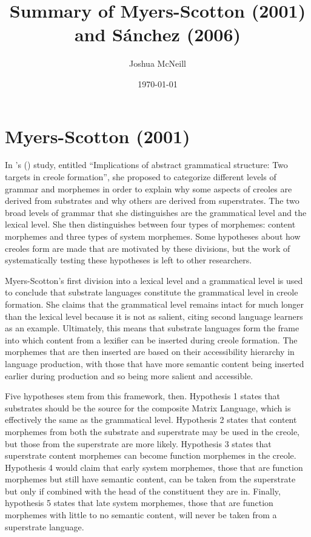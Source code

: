 \documentclass{article}
\title{Summary of Myers-Scotton (2001) and Sánchez (2006)}
\author{Joshua McNeill}
\date{\today}
\newcommand{\titl}[1]{``#1''}
\begin{document}
  \maketitle
  \onehalfspacing
  \section{Myers-Scotton (2001)}
    In \citeauthor{myers-scotton_implications_2001}'s (\citeyear{myers-scotton_implications_2001}) study, entitled \titl{Implications of abstract grammatical structure: Two targets in creole formation}, she proposed to categorize different levels of grammar and morphemes in order to explain why some aspects of creoles are derived from substrates and why others are derived from superstrates.
    The two broad levels of grammar that she distinguishes are the grammatical level and the lexical level.
    She then distinguishes between four types of morphemes: content morphemes and three types of system morphemes.
    Some hypotheses about how creoles form are made that are motivated by these divisions, but the work of systematically testing these hypotheses is left to other researchers.

    Myers-Scotton's first division into a lexical level and a grammatical level is used to conclude that substrate languages constitute the grammatical level in creole formation.
    She claims that the grammatical level remains intact for much longer than the lexical level because it is not as salient, citing second language learners as an example.
    Ultimately, this means that substrate languages form the frame into which content from a lexifier can be inserted during creole formation.
    The morphemes that are then inserted are based on their accessibility hierarchy in language production, with those that have more semantic content being inserted earlier during production and so being more salient and accessible.

    Five hypotheses stem from this framework, then.
    Hypothesis 1 states that substrates should be the source for the composite Matrix Language, which is effectively the same as the grammatical level.
    Hypothesis 2 states that content morphemes from both the substrate and superstrate may be used in the creole, but those from the superstrate are more likely.
    Hypothesis 3 states that superstrate content morphemes can become function morphemes in the creole.
    Hypothesis 4 would claim that early system morphemes, those that are function morphemes but still have semantic content, can be taken from the superstrate but only if combined with the head of the constituent they are in.
    Finally, hypothesis 5 states that late system morphemes, those that are function morphemes with little to no semantic content, will never be taken from a superstrate language.
\end{document}
